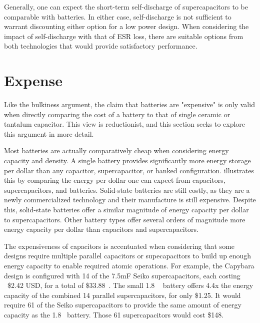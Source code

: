 
Generally, one can expect the short-term self-discharge of supercapacitors to be comparable with batteries. In either case, self-discharge is not sufficient to warrant discounting either option for a low power design. When considering the impact of self-discharge with that of ESR loss, there are suitable options from both technologies that would provide satisfactory performance.


\section{Expense}
\label{sec:battery:cost}
Like the bulkiness argument, the claim that batteries are "expensive" is only valid when directly comparing the cost of a battery to that of single ceramic or tantalum capacitor. This view is reductionist, and this section seeks to explore this argument in more detail.

Most batteries are actually comparatively cheap when considering energy capacity and density. 
A single battery provides significantly more energy storage per dollar than any capacitor, supercapacitor, or banked configuration.
 illustrates this by comparing the energy per dollar one can expect from capacitors, supercapacitors, and batteries. 
Solid-state batteries are still costly, as they are a newly commercialized technology and their manufacture is still expensive. 
Despite this, solid-state batteries offer a similar magnitude of energy capacity per dollar to supercapacitors.
Other battery types offer several orders of magnitude more energy capacity per dollar than capacitors and supercapacitors.

The expensiveness of capacitors is accentuated when considering that some designs require multiple parallel capacitors or supecapacitors to build up enough energy capacity to enable required atomic operations. For example, the Capybara design is configured with 14 of the 7.5\si{\milli\farad} Seiko supercapacitors, each costing ~\$2.42 USD, for a total of \$33.88~\cite{colinReconfigurable18}. The small 1.8 \si{\milli\Ah} battery offers 4.4x the energy capacity of the combined 14 parallel supercapacitors, for only \$1.25.
It would require 61 of the Seiko supercapacitors to provide the same amount of energy capacity as the 1.8\si{\milli\Ah} battery. Those 61 supercapacitors would cost \$148.

